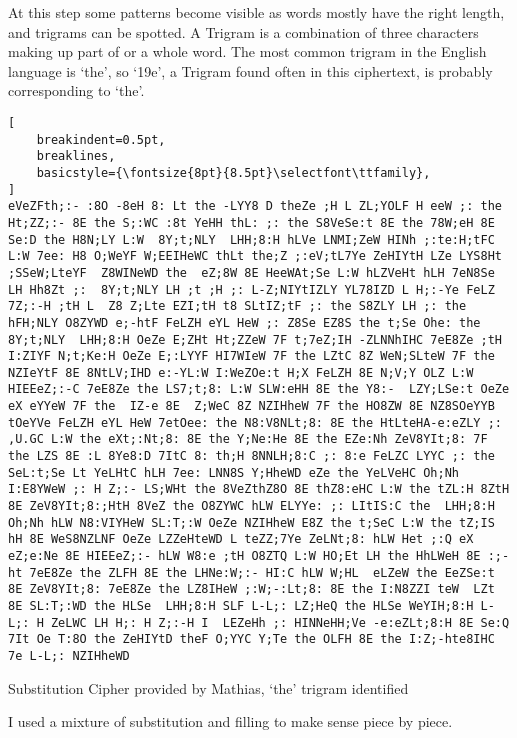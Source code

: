 \documentclass{uva-inf-bachelor-thesis}
\begin{document}
At this step some patterns become visible as words mostly have the right length,
and trigrams can be spotted. A Trigram is a combination of three characters
making up part of or a whole word. The most common trigram in the English
language is `the', so `19e', a Trigram found often in this ciphertext, is
probably corresponding to `the'.
\newpage
\begin{lstlisting}[
    breakindent=0.5pt,
    breaklines,
    basicstyle={\fontsize{8pt}{8.5pt}\selectfont\ttfamily},
]
eVeZFth;:- :8O -8eH 8: Lt the -LYY8 D theZe ;H L ZL;YOLF H eeW ;: the Ht;ZZ;:- 8E the S;:WC :8t YeHH thL: ;: the S8VeSe:t 8E the 78W;eH 8E Se:D the H8N;LY L:W  8Y;t;NLY  LHH;8:H hLVe LNMI;ZeW HINh ;:te:H;tFC L:W 7ee: H8 O;WeYF W;EEIHeWC thLt the;Z ;:eV;tL7Ye ZeHIYtH LZe LYS8Ht ;SSeW;LteYF  Z8WINeWD the  eZ;8W 8E HeeWAt;Se L:W hLZVeHt hLH 7eN8Se LH Hh8Zt ;:  8Y;t;NLY LH ;t ;H ;: L-Z;NIYtIZLY YL78IZD L H;:-Ye FeLZ 7Z;:-H ;tH L  Z8 Z;Lte EZI;tH t8 SLtIZ;tF ;: the S8ZLY LH ;: the  hFH;NLY O8ZYWD e;-htF FeLZH eYL HeW ;: Z8Se EZ8S the t;Se Ohe: the  8Y;t;NLY  LHH;8:H OeZe E;ZHt Ht;ZZeW 7F t;7eZ;IH -ZLNNhIHC 7eE8Ze ;tH I:ZIYF N;t;Ke:H OeZe E;:LYYF HI7WIeW 7F the LZtC 8Z WeN;SLteW 7F the NZIeYtF 8E 8NtLV;IHD e:-YL:W I:WeZOe:t H;X FeLZH 8E N;V;Y OLZ L:W HIEEeZ;:-C 7eE8Ze the LS7;t;8: L:W SLW:eHH 8E the Y8:-  LZY;LSe:t OeZe eX eYYeW 7F the  IZ-e 8E  Z;WeC 8Z NZIHheW 7F the HO8ZW 8E NZ8SOeYYB tOeYVe FeLZH eYL HeW 7etOee: the N8:V8NLt;8: 8E the HtLteHA-e:eZLY ;: ,U.GC L:W the eXt;:Nt;8: 8E the Y;Ne:He 8E the EZe:Nh ZeV8YIt;8: 7F the LZS 8E :L 8Ye8:D 7ItC 8: th;H 8NNLH;8:C ;: 8:e FeLZC LYYC ;: the SeL:t;Se Lt YeLHtC hLH 7ee: LNN8S Y;HheWD eZe the YeLVeHC Oh;Nh I:E8YWeW ;: H Z;:- LS;WHt the 8VeZthZ8O 8E thZ8:eHC L:W the tZL:H 8ZtH 8E ZeV8YIt;8:;HtH 8VeZ the O8ZYWC hLW ELYYe: ;: LItIS:C the  LHH;8:H Oh;Nh hLW N8:VIYHeW SL:T;:W OeZe NZIHheW E8Z the t;SeC L:W the tZ;IS hH 8E WeS8NZLNF OeZe LZZeHteWD L teZZ;7Ye ZeLNt;8: hLW Het ;:Q eX eZ;e:Ne 8E HIEEeZ;:- hLW W8:e ;tH O8ZTQ L:W HO;Et LH the HhLWeH 8E :;-ht 7eE8Ze the ZLFH 8E the LHNe:W;:- HI:C hLW W;HL  eLZeW the EeZSe:t 8E ZeV8YIt;8: 7eE8Ze the LZ8IHeW ;:W;-:Lt;8: 8E the I:N8ZZI teW  LZt 8E SL:T;:WD the HLSe  LHH;8:H SLF L-L;: LZ;HeQ the HLSe WeYIH;8:H L-L;: H ZeLWC LH H;: H Z;:-H I  LEZeHh ;: HINNeHH;Ve -e:eZLt;8:H 8E Se:Q 7It Oe T:8O the ZeHIYtD theF O;YYC Y;Te the OLFH 8E the I:Z;-hte8IHC 7e L-L;: NZIHheWD
\end{lstlisting}
\caption[lstlisting]{Substitution Cipher provided by Mathias, `the' trigram identified}
\vspace{20pt}
I used a mixture of substitution and filling to make sense piece by piece.
\end{document}
